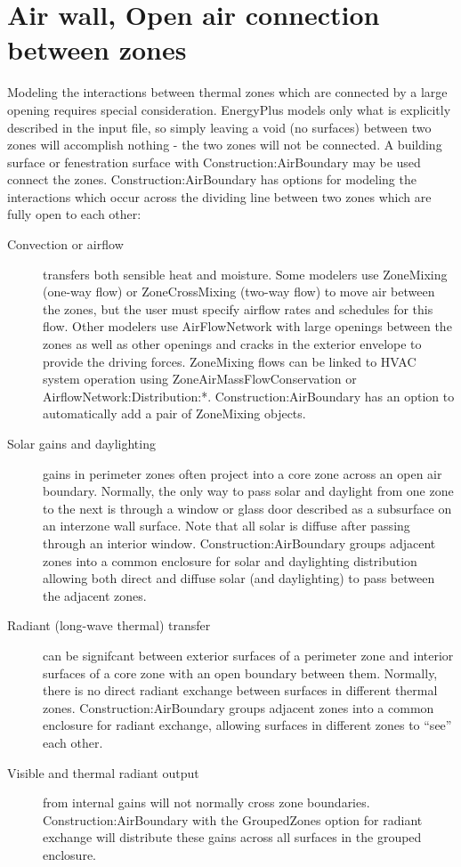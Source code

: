\section{Air wall, Open air connection between zones}\label{air-wall-open-air-connection-between-zones}

Modeling the interactions between thermal zones which are connected by a large opening requires special consideration. EnergyPlus models only what is explicitly described in the input file, so simply leaving a void (no surfaces) between two zones will accomplish nothing - the two zones will not be connected. A building surface or fenestration surface with Construction:AirBoundary may be used connect the zones. Construction:AirBoundary has options for modeling the interactions which occur across the dividing line between two zones which are fully open to each other:

\begin{description}
  \item[Convection or airflow] transfers both sensible heat and moisture. Some modelers use ZoneMixing (one-way flow) or ZoneCrossMixing (two-way flow) to move air between the zones, but the user must specify airflow rates and schedules for this flow. Other modelers use AirFlowNetwork with large openings between the zones as well as other openings and cracks in the exterior envelope to provide the driving forces. ZoneMixing flows can be linked to HVAC system operation using ZoneAirMassFlowConservation or AirflowNetwork:Distribution:*. Construction:AirBoundary has an option to automatically add a pair of ZoneMixing objects.

  \item[Solar gains and daylighting] gains in perimeter zones often project into a core zone across an open air boundary. Normally, the only way to pass solar and daylight from one zone to the next is through a window or glass door described as a subsurface on an interzone wall surface. Note that all solar is diffuse after passing through an interior window. Construction:AirBoundary groups adjacent zones into a common enclosure for solar and daylighting distribution allowing both direct and diffuse solar (and daylighting) to pass between the adjacent zones.

  \item[Radiant (long-wave thermal) transfer] can be signifcant between exterior surfaces of a perimeter zone and interior surfaces of a core zone with an open boundary between them. Normally, there is no direct radiant exchange between surfaces in different thermal zones. Construction:AirBoundary groups adjacent zones into a common enclosure for radiant exchange, allowing surfaces in different zones to ``see'' each other.

  \item[Visible and thermal radiant output] from internal gains will not normally cross zone boundaries. Construction:AirBoundary with the GroupedZones option for radiant exchange will distribute these gains across all surfaces in the grouped enclosure.
\end{description}

